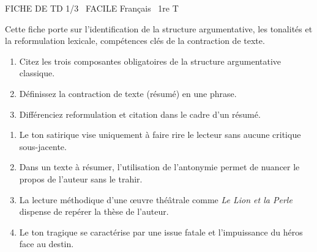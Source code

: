 \documentclass[11pt]{article}
\begin{document}
\begin{tcolorbox}[enhanced,colback=popink,colframe=popink,arc=10pt,boxrule=0pt,left=12pt,right=12pt,top=9pt,bottom=9pt]
{\color{white}\popxbold\small FICHE DE TD 1/3 \textbullet\ FACILE \hfill Français \textbullet\ 1re T\par}
\end{tcolorbox}
\vspace{4pt}
Cette fiche porte sur l'identification de la structure argumentative, les tonalités et la reformulation lexicale, compétences clés de la contraction de texte.

\begin{exercice}
\begin{enumerate}
    \item Citez les trois composantes obligatoires de la structure argumentative classique.
    \item Définissez la contraction de texte (résumé) en une phrase.
    \item Différenciez \og reformulation \fg{} et \og citation \fg{} dans le cadre d'un résumé.
\end{enumerate}
\end{exercice}

\begin{exercice}
\begin{enumerate}
    \item Le ton satirique vise uniquement à faire rire le lecteur sans aucune critique sous-jacente.
    \item Dans un texte à résumer, l'utilisation de l'antonymie permet de nuancer le propos de l'auteur sans le trahir.
    \item La lecture méthodique d'une œuvre théâtrale comme \textit{Le Lion et la Perle} dispense de repérer la thèse de l'auteur.
    \item Le ton tragique se caractérise par une issue fatale et l'impuissance du héros face au destin.
\end{enumerate}
\end{exercice}
\end{document}
